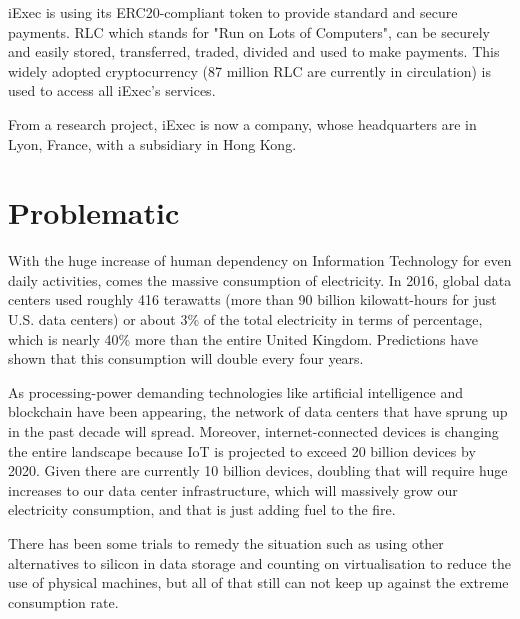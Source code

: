   iExec is using its ERC20-compliant token to provide standard and secure payments. RLC\cite{RLC} which stands for
  "Run on Lots of Computers", can be securely and easily stored, transferred, traded, divided and used
  to make payments. This widely adopted cryptocurrency (87 million RLC are currently in circulation)
  is used to access all iExec's services.

  From a research project, iExec is now a company, whose headquarters are in Lyon, France, with a
  subsidiary in Hong Kong.

\section{Problematic}
  With the huge increase of human dependency on Information Technology for even daily activities,
  comes the massive consumption of electricity. In 2016, global data centers used roughly 416
  terawatts (more than 90 billion kilowatt-hours for just U.S. data centers) or about 3\% of the
  total electricity in terms of percentage, which is nearly 40\% more than the entire United Kingdom.
  Predictions have shown that this consumption will double every four years\cite{consumption-prediction}.

  As processing-power demanding technologies like artificial intelligence and blockchain have
  been appearing, the network of data centers that have sprung up in the past decade will spread.
  Moreover, internet-connected devices is changing the entire landscape because IoT is
  projected to exceed 20 billion devices by 2020. Given there are currently 10 billion devices,
  doubling that will require huge increases to our data center infrastructure, which will
  massively grow our electricity consumption, and that is just adding fuel to the fire.

  There has been some trials to remedy the situation such as using other alternatives to silicon in
  data storage and counting on virtualisation to reduce the use of physical machines, but all of that
  still can not keep up against the extreme consumption rate.


